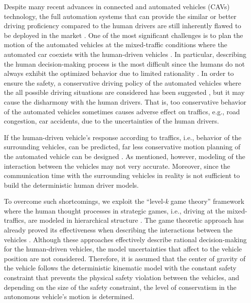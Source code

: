 \documentclass[10pt,journal]{IEEEtran}
\begin{document}
	Despite many recent advances in connected and automated vehicles (CAVs) technology, the full automation systems that can provide the similar or better driving proficiency compared to the human drivers are still inherently flawed to be deployed in the market \cite{Okuda2014}. One of the most significant challenges is to plan the motion of the automated vehicles at the mixed-traffic conditions where the automated car coexists with the human-driven vehicles \cite{Lazar2018}. In particular, describing the human decision-making process is the most difficult since the humans do not always exhibit the optimized behavior due to limited rationality \cite{Griffiths2015}. In order to ensure the safety, a conservative driving policy of the automated vehicles where the all possible driving situations are considered has been suggested \cite{Claussmann2015, Brechtel2014}, but it may cause the disharmony with the human drivers. That is, too conservative behavior of the automated vehicles sometimes causes adverse effect on traffics, e.g., road congestion, car accidents, due to the uncertainties of the human drivers.
	
	If the human-driven vehicle's response according to traffics, i.e., behavior of the surrounding vehicles, can be predicted, far less conservative motion planning of the automated vehicle can be designed \cite{Sadigh2016}. As mentioned, however, modeling of the interaction between the vehicles may not very accurate. Moreover, since the communication time with the surrounding vehicles in reality is not sufficient to build the deterministic human driver models.
	
	To overcome such shortcomings, we exploit the ``level-\textit{k} game theory'' framework where the human thought processes in strategic games, i.e., driving at the mixed-traffics, are modeled in hierarchical structure \cite{Stahl1993}. The game theoretic approach has already proved its effectiveness when describing the interactions between the vehicles \cite{Li2017, Li2018, Tian2018}. Although these approaches effectively describe rational decision-making for the human-driven vehicles, the model uncertainties that affect to the vehicle position are not considered. Therefore, it is assumed that the center of gravity of the vehicle follows the deterministic kinematic model with the constant safety constraint that prevents the physical safety violation between the vehicles, and depending on the size of the safety constraint, the level of conservatism in the autonomous vehicle's motion is determined. 
	
\end{document}
